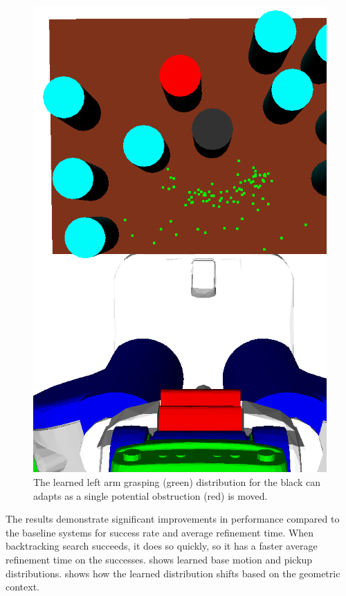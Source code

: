 \begin{figure}[t]
    \includegraphics[scale=0.13]{images/grasp_context_3.png}
  \caption{\small{The learned left arm grasping (green) distribution
      for the black can adapts as a single potential obstruction (red) is
      moved.}}
  \label{fig:context}
\end{figure}

The results demonstrate significant improvements in performance
compared to the baseline systems for success rate and average refinement time. When backtracking
search succeeds, it does so quickly, so it has a faster average
refinement time on the successes.  shows learned
base motion and pickup distributions.  shows how
the learned distribution shifts based on the geometric context.

